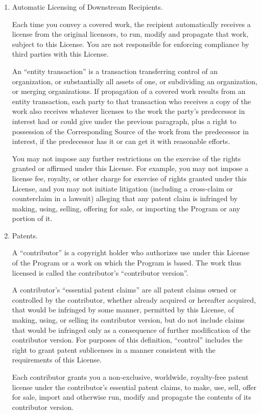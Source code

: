 \documentclass[11pt,twoside,fleqn,openright,titlepage]{cslreport}
\begin{document}
\begin{small}
\begin{enumerate}
\item Automatic Licensing of Downstream Recipients.

Each time you convey a covered work, the recipient automatically
receives a license from the original licensors, to run, modify and
propagate that work, subject to this License.  You are not responsible
for enforcing compliance by third parties with this License.

An ``entity transaction'' is a transaction transferring control of an
organization, or substantially all assets of one, or subdividing an
organization, or merging organizations.  If propagation of a covered
work results from an entity transaction, each party to that
transaction who receives a copy of the work also receives whatever
licenses to the work the party's predecessor in interest had or could
give under the previous paragraph, plus a right to possession of the
Corresponding Source of the work from the predecessor in interest, if
the predecessor has it or can get it with reasonable efforts.

You may not impose any further restrictions on the exercise of the
rights granted or affirmed under this License.  For example, you may
not impose a license fee, royalty, or other charge for exercise of
rights granted under this License, and you may not initiate litigation
(including a cross-claim or counterclaim in a lawsuit) alleging that
any patent claim is infringed by making, using, selling, offering for
sale, or importing the Program or any portion of it.

\item Patents.

A ``contributor'' is a copyright holder who authorizes use under this
License of the Program or a work on which the Program is based.  The
work thus licensed is called the contributor's ``contributor version''.

A contributor's ``essential patent claims'' are all patent claims
owned or controlled by the contributor, whether already acquired or
hereafter acquired, that would be infringed by some manner, permitted
by this License, of making, using, or selling its contributor version,
but do not include claims that would be infringed only as a
consequence of further modification of the contributor version.  For
purposes of this definition, ``control'' includes the right to grant
patent sublicenses in a manner consistent with the requirements of
this License.

Each contributor grants you a non-exclusive, worldwide, royalty-free
patent license under the contributor's essential patent claims, to
make, use, sell, offer for sale, import and otherwise run, modify and
propagate the contents of its contributor version.


\end{enumerate}
\end{small}
\end{document}
